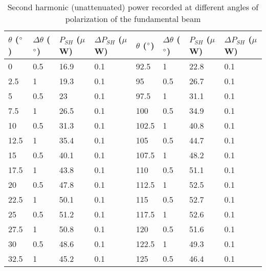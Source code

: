 \begin{table}[]
\centering
\caption{Second harmonic (unattenuated) power recorded at different angles of polarization of the fundamental beam}
\label{tab:shpowvspol}
\begin{tabular}{|l|l|l|l||l|l|l|l|}
\hline
$\theta$ ($\degree$) & $\Delta \theta$ ($\degree$) & $P_{SH}$ ($\mu$W) & $\Delta P_{SH}$ ($\mu$W) & $\theta$ ($\degree$) & $\Delta \theta$ ($\degree$) & $P_{SH}$ ($\mu$W) & $\Delta P_{SH}$ ($\mu$W) \\ \hline
0     & 0.5         & 16.9            & 0.1         & 92.5  & 1           & 22.8            & 0.1         \\ \hline
2.5   & 1           & 19.3            & 0.1         & 95    & 0.5         & 26.7            & 0.1         \\ \hline
5     & 0.5         & 23              & 0.1         & 97.5  & 1           & 31.1            & 0.1         \\ \hline
7.5   & 1           & 26.5            & 0.1         & 100   & 0.5         & 34.9            & 0.1         \\ \hline
10    & 0.5         & 31.3            & 0.1         & 102.5 & 1           & 40.8            & 0.1         \\ \hline
12.5  & 1           & 35.4            & 0.1         & 105   & 0.5         & 44.7            & 0.1         \\ \hline
15    & 0.5         & 40.1            & 0.1         & 107.5 & 1           & 48.2            & 0.1         \\ \hline
17.5  & 1           & 43.8            & 0.1         & 110   & 0.5         & 51.1            & 0.1         \\ \hline
20    & 0.5         & 47.8            & 0.1         & 112.5 & 1           & 52.5            & 0.1         \\ \hline
22.5  & 1           & 50.1            & 0.1         & 115   & 0.5         & 52.7            & 0.1         \\ \hline
25    & 0.5         & 51.2            & 0.1         & 117.5 & 1           & 52.6            & 0.1         \\ \hline
27.5  & 1           & 50.8            & 0.1         & 120   & 0.5         & 51.6            & 0.1         \\ \hline
30    & 0.5         & 48.6            & 0.1         & 122.5 & 1           & 49.3            & 0.1         \\ \hline
32.5  & 1           & 45.2            & 0.1         & 125   & 0.5         & 46.4            & 0.1         \\ \hline

\end{tabular}
\end{table}
